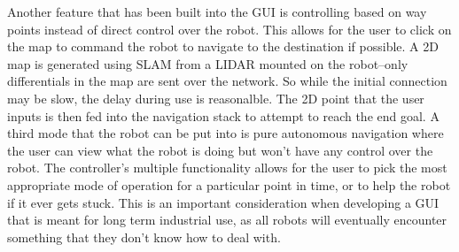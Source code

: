 Another feature that has been built into the GUI is controlling based on way points instead of direct control over the robot. This allows for the user to click on the map to command the robot to navigate to the destination if possible. A 2D map is generated using SLAM from a LIDAR mounted on the robot--only differentials in the map are sent over the network. So while the initial connection may be slow, the delay during use is reasonalble. The 2D point that the user inputs is then fed into the navigation stack to attempt to reach the end goal. A third mode that the robot can be put into is pure autonomous navigation where the user can view what the robot is doing but won't have any control over the robot. The controller's multiple functionality allows for the user to pick the most appropriate mode of operation for a particular point in time, or to help the robot if it ever gets stuck. This is an important consideration when developing a GUI that is meant for long term industrial use, as all robots will eventually encounter something that they don't know how to deal with. 

